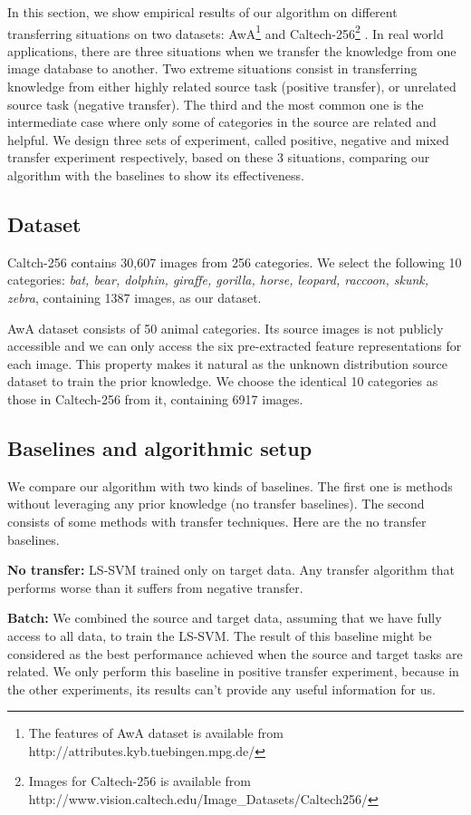In this section, we show empirical results of our algorithm on different transferring situations on two datasets: AwA\footnote{The features of AwA dataset is available from http://attributes.kyb.tuebingen.mpg.de/} \cite{lampert2009learning} and Caltech-256\footnote{Images for Caltech-256 is available from http://www.vision.caltech.edu/Image\_Datasets/Caltech256/} \cite{griffin2007caltech}. In real world applications, there are three situations when we transfer the knowledge from one image database to another. Two extreme situations consist in transferring knowledge from either highly related source task (positive transfer), or unrelated source task (negative transfer). The third and the most common one is the intermediate case where only some of categories in the source are related and helpful. We design three sets of experiment, called positive, negative and mixed transfer experiment respectively, based on these 3 situations, comparing our algorithm with the baselines to show its effectiveness.
\subsection{Dataset}
Caltch-256 contains 30,607 images from 256 categories. We select the following 10 categories: \textit{bat, bear, dolphin, giraffe, gorilla, horse, leopard, raccoon, skunk, zebra}, containing 1387 images, as our dataset.

AwA dataset consists of 50 animal categories. Its source images is not publicly accessible and we can only access the six pre-extracted feature representations for each image. This property makes it natural as the unknown distribution source dataset to train the prior knowledge. We choose the identical 10 categories as those in Caltech-256 from it, containing 6917 images.

\subsection{Baselines and algorithmic setup}
We compare our algorithm with two kinds of baselines. The first one is methods without leveraging any prior knowledge (no transfer baselines). The second consists of some methods with transfer techniques. Here are the no transfer baselines.

\textbf{No transfer:} LS-SVM trained only on target data. Any transfer algorithm that performs worse than it suffers from negative transfer.

\textbf{Batch:} We combined the source and target data, assuming that we have fully access to all data, to train the LS-SVM. The result of this baseline might be considered as the best performance achieved when the source and target tasks are related. We only perform this baseline in positive transfer experiment, because in the other experiments, its results can't provide any useful information for us.

